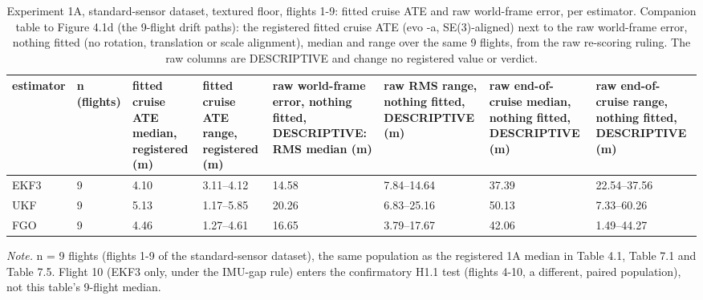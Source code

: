 \begin{table}[htbp]
\centering
\footnotesize
\caption{Experiment 1A, standard-sensor dataset, textured floor, flights 1-9: fitted cruise ATE and raw world-frame error, per estimator. Companion table to Figure 4.1d (the 9-flight drift paths): the registered fitted cruise ATE (evo -a, SE(3)-aligned) next to the raw world-frame error, nothing fitted (no rotation, translation or scale alignment), median and range over the same 9 flights, from the raw re-scoring ruling. The raw columns are DESCRIPTIVE and change no registered value or verdict.}
\label{tab:T9}
\begin{tabular}{p{}p{}p{}p{}p{}p{}p{}p{}}
\toprule
\textbf{estimator} & \textbf{n (flights)} & \textbf{fitted cruise ATE median, registered (m)} & \textbf{fitted cruise ATE range, registered (m)} & \textbf{raw world-frame error, nothing fitted, DESCRIPTIVE: RMS median (m)} & \textbf{raw RMS range, nothing fitted, DESCRIPTIVE (m)} & \textbf{raw end-of-cruise median, nothing fitted, DESCRIPTIVE (m)} & \textbf{raw end-of-cruise range, nothing fitted, DESCRIPTIVE (m)} \\
\midrule
EKF3 & 9 & 4.10 & 3.11--4.12 & 14.58 & 7.84--14.64 & 37.39 & 22.54--37.56 \\
UKF & 9 & 5.13 & 1.17--5.85 & 20.26 & 6.83--25.16 & 50.13 & 7.33--60.26 \\
FGO & 9 & 4.46 & 1.27--4.61 & 16.65 & 3.79--17.67 & 42.06 & 1.49--44.27 \\
\bottomrule
\end{tabular}
\par\smallskip\raggedright
\textit{Note.} n = 9 flights (flights 1-9 of the standard-sensor dataset), the same population as the registered 1A median in Table 4.1, Table 7.1 and Table 7.5. Flight 10 (EKF3 only, under the IMU-gap rule) enters the confirmatory H1.1 test (flights 4-10, a different, paired population), not this table's 9-flight median.\par

\end{table}
